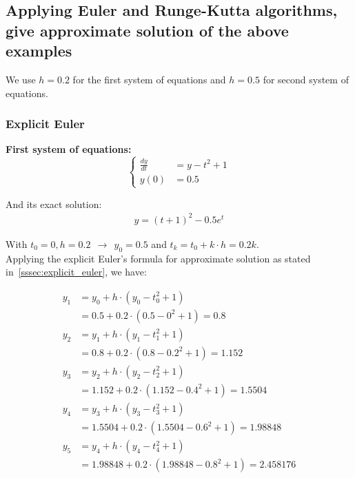 \documentclass[a4paper]{article}
\numberwithin{equation}{section}
\begin{document}
	
\subsection{Applying Euler and Runge-Kutta algorithms, give approximate solution of the above examples}
We use \(h = 0.2\) for the first system of equations and  \(h = 0.5\) for second system of equations.
\subsubsection{Explicit Euler}
\textbf{First system of equations:}
\begin{equation*}
  \begin{cases}
    \frac{dy}{dt} & = y - t^2 +1 \\
    y(0)          & = 0.5
  \end{cases}
\end{equation*}

And its exact solution:
\begin{align*}
   y = (t+1)^2 -0.5e^t
\end{align*} 

With \(t_0 = 0, h=0.2 ~~\rightarrow ~~ y_0 = 0.5\) and \(t_k = t_0 + k \cdot h = 0.2k\).\\

Applying the explicit Euler's formula for approximate solution as stated in~\ref{sssec:explicit_euler}, we have:

\begin{align*}
  y_1 & = y_0 + h\cdot(y_0-t_0^2+1)                                     \\
      & = 0.5 + 0.2 \cdot(0.5-0^2+1) =0.8                                                                       \\
 y_2 & = y_1 + h\cdot(y_1-t_1^2+1)                                     \\
      & = 0.8 + 0.2 \cdot(0.8-0.2^2+1) =1.152                                          \\
   y_3 & = y_2 + h\cdot(y_2-t_2^2+1)                                     \\
      & = 1.152 + 0.2 \cdot(1.152-0.4^2+1) =1.5504  
\\
 y_4 & = y_3 + h\cdot(y_3-t_3^2+1)                                     \\
      & = 1.5504 + 0.2 \cdot(1.5504-0.6^2+1) =1.98848   
      \\
       y_5 & = y_4 + h\cdot(y_4-t_4^2+1)                                     \\
      & = 1.98848 + 0.2 \cdot(1.98848-0.8^2+1) =2.458176  
\end{align*}
\end{document}
